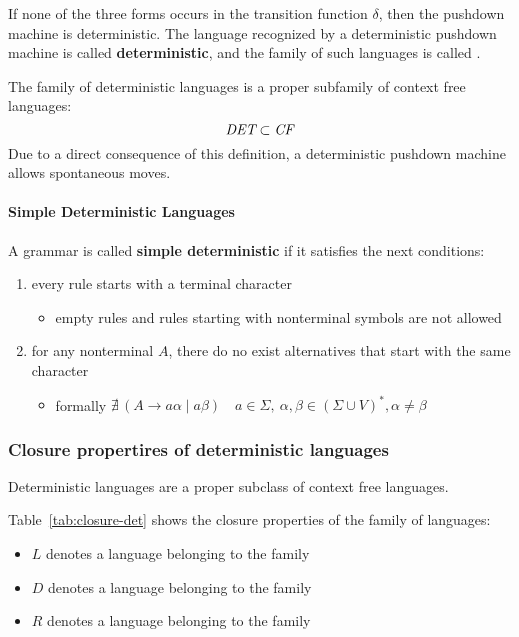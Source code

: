 \documentclass[english]{article}
\begin{document}
If none of the three forms occurs in the transition function \(\delta\), then the pushdown machine is deterministic.
The language recognized by a deterministic pushdown machine is called \textbf{deterministic}, and the family of such languages is called \DET.

The family of deterministic languages is a proper subfamily of context free languages:
\[ \textit{DET} \subset \textit{CF} \]
Due to a direct consequence of this definition, a deterministic pushdown machine allows spontaneous moves.

\paragraph{Simple Deterministic Languages}

A grammar is called \textbf{simple deterministic} if it satisfies the next conditions:

\begin{enumerate}
  \item every rule \RP starts with a terminal character
        \begin{itemize}
          \item empty rules and rules starting with nonterminal symbols are not allowed
        \end{itemize}
  \item for any nonterminal \(A\), there do no exist alternatives that start with the same character
        \begin{itemize}
          \item formally \(\nexists \, \left( A \rightarrow a \alpha \mid a \beta \right) \quad a \in \Sigma, \ \alpha, \beta \in \left( \Sigma \cup V \right)^\ast, \alpha \neq \beta\)
        \end{itemize}
\end{enumerate}

\subsubsection{Closure propertires of deterministic \CF languages}

Deterministic languages are a proper subclass of context free languages.

Table~\ref{tab:closure-det} shows the closure properties of the \DET family of languages:

\begin{itemize}
  \item \(L\) denotes a language belonging to the \CF family
  \item \(D\) denotes a language belonging to the \DET family
  \item \(R\) denotes a language belonging to the \REG family
\end{itemize}
\end{document}

